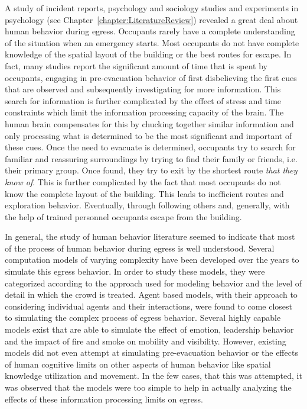  A study of incident reports, psychology and sociology studies and experiments in psychology (see Chapter~\ref{chapter:LiteratureReview}) revealed a great deal about human behavior during egress. Occupants rarely have a complete understanding of the situation when an emergency starts. Most occupants do not have complete knowledge of the spatial layout of the building or the best routes for escape. In fact, many studies report the significant amount of time that is spent by occupants, engaging in pre-evacuation behavior of first disbelieving the first cues that are observed and subsequently investigating for more information. This search for information is further complicated by the effect of stress and time constraints which limit the information processing capacity of the brain. The human brain compensates for this by chucking together similar information and only processing what is determined to be the most significant and important of these cues. Once the need to evacuate is determined, occupants try to search for familiar and reassuring surroundings by trying to find their family or friends, i.e. their primary group. Once found, they try to exit by the shortest route \emph{that they know of}. This is further complicated by the fact that most occupants do not know the complete layout of the building. This leads to inefficient routes and exploration behavior. Eventually, through following others and, generally, with the help of trained personnel occupants escape from the building.

 In general, the study of human behavior literature seemed to indicate that most of the process of human behavior during egress is well understood. Several computation models of varying complexity have been developed over the years to simulate this egress behavior. In order to study these models, they were categorized according to the approach used for modeling behavior and the level of detail in which the crowd is treated. Agent based models, with their approach to considering individual agents and their interactions, were found to come closest to simulating the complex process of egress behavior. Several highly capable models exist that are able to simulate the effect of emotion, leadership behavior and the impact of fire and smoke on mobility and visibility. However, existing models did not even attempt at simulating pre-evacuation behavior or the effects of human cognitive limits on other aspects of human behavior like spatial knowledge utilization and movement. In the few cases, that this was attempted, it was observed that the models were too simple to help in actually analyzing the effects of these information processing limits on egress.


